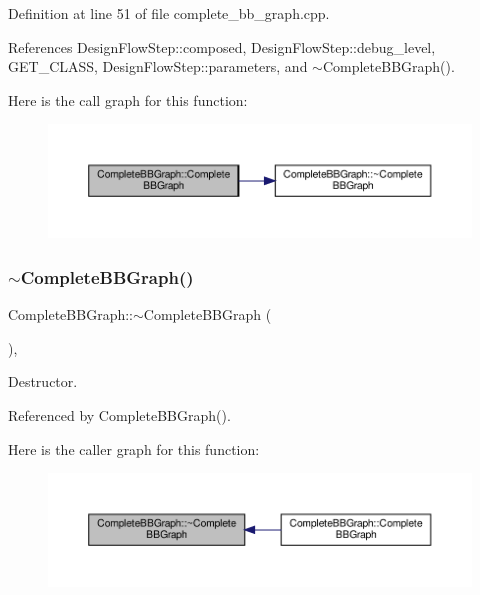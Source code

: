 Definition at line 51 of file complete\+\_\+bb\+\_\+graph.\+cpp.



References Design\+Flow\+Step\+::composed, Design\+Flow\+Step\+::debug\+\_\+level, G\+E\+T\+\_\+\+C\+L\+A\+SS, Design\+Flow\+Step\+::parameters, and $\sim$\+Complete\+B\+B\+Graph().

Here is the call graph for this function\+:
\nopagebreak
\begin{figure}[H]
\begin{center}
\leavevmode
\includegraphics[width=350pt]{d2/d02/classCompleteBBGraph_a0d49dbafe850acde991eedbe7aef7190_cgraph}
\end{center}
\end{figure}
\mbox{\label{classCompleteBBGraph_af1653d457288fb3d2fe9ef019f0f633c}} 
\subsubsection{\texorpdfstring{$\sim$\+Complete\+B\+B\+Graph()}{~CompleteBBGraph()}}
{\footnotesize\ttfamily Complete\+B\+B\+Graph\+::$\sim$\+Complete\+B\+B\+Graph (\begin{DoxyParamCaption}{ }\end{DoxyParamCaption})\hspace{0.3cm}{\ttfamily [override]}, {\ttfamily [default]}}



Destructor. 



Referenced by Complete\+B\+B\+Graph().

Here is the caller graph for this function\+:
\nopagebreak
\begin{figure}[H]
\begin{center}
\leavevmode
\includegraphics[width=350pt]{d2/d02/classCompleteBBGraph_af1653d457288fb3d2fe9ef019f0f633c_icgraph}
\end{center}
\end{figure}



